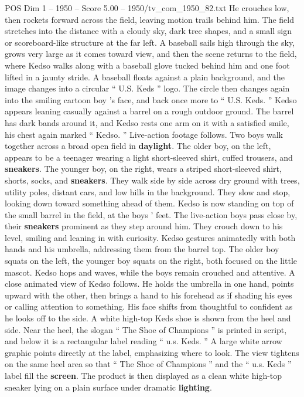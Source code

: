 \begin{textsample}{POS Dim 1 – 1950 – Score 5.00 – 1950/tv\_com\_1950\_82.txt}
He crouches low, then rockets forward across the field, leaving motion trails behind him.
The field stretches into the distance with a cloudy sky, dark tree shapes, and a small sign or scoreboard-like structure at the far left.
A baseball sails high through the sky, grows very large as it comes toward view, and then the scene returns to the field, where Kedso walks along with a baseball glove tucked behind him and one foot lifted in a jaunty stride.
A baseball floats against a plain background, and the image changes into a circular “ U.S.
Keds ” logo.
The circle then changes again into the smiling cartoon boy ’s face, and back once more to “ U.S.
Keds. ” Kedso appears leaning casually against a barrel on a rough outdoor ground.
The barrel has dark bands around it, and Kedso rests one arm on it with a satisfied smile, his chest again marked “ Kedso. ” Live-action footage follows.
Two boys walk together across a broad open field in \textbf{daylight}.
The older boy, on the left, appears to be a teenager wearing a light short-sleeved shirt, cuffed trousers, and \textbf{sneakers}.
The younger boy, on the right, wears a striped short-sleeved shirt, shorts, socks, and \textbf{sneakers}.
They walk side by side across dry ground with trees, utility poles, distant cars, and low hills in the background.
They slow and stop, looking down toward something ahead of them.
Kedso is now standing on top of the small barrel in the field, at the boys ’ feet.
The live-action boys pass close by, their \textbf{sneakers} prominent as they step around him.
They crouch down to his level, smiling and leaning in with curiosity.
Kedso gestures animatedly with both hands and his umbrella, addressing them from the barrel top.
The older boy squats on the left, the younger boy squats on the right, both focused on the little mascot.
Kedso hops and waves, while the boys remain crouched and attentive.
A close animated view of Kedso follows.
He holds the umbrella in one hand, points upward with the other, then brings a hand to his forehead as if shading his eyes or calling attention to something.
His face shifts from thoughtful to confident as he looks off to the side.
A white high-top Keds shoe is shown from the heel and side.
Near the heel, the slogan “ The Shoe of Champions ” is printed in script, and below it is a rectangular label reading “ u.s.
Keds. ” A large white arrow graphic points directly at the label, emphasizing where to look.
The view tightens on the same heel area so that “ The Shoe of Champions ” and the “ u.s.
Keds ” label fill the \textbf{screen}.
The product is then displayed as a clean white high-top sneaker lying on a plain surface under dramatic \textbf{lighting}.

\end{textsample}
